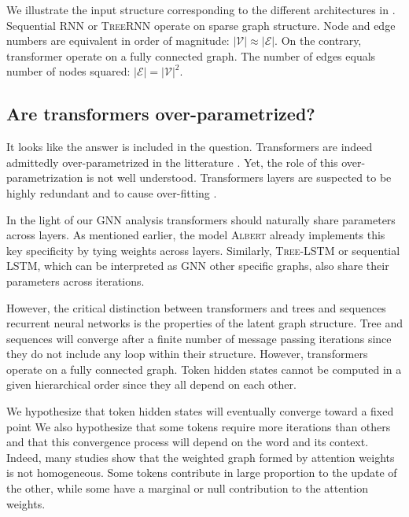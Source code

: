We illustrate the input structure corresponding to the different architectures in .
Sequential \textsc{RNN} or \textsc{TreeRNN} operate on sparse graph structure. Node and edge numbers are equivalent in order of magnitude: $|\mathcal{V}| \approx |\mathcal{E}|$. On the contrary, transformer operate on a fully connected graph. The number of edges equals number of nodes squared: $|\mathcal{E}| = |\mathcal{V}|^2$.

\subsection{Are transformers over-parametrized?}


It looks like the answer is included in the question. 
Transformers are indeed admittedly over-parametrized in the litterature \parencite{chen_20, hou_20, voita_19}. 
Yet, the role of this over-parametrization is not well understood. 
Transformers layers are suspected to be highly redundant \parencite{liu_20} and to cause over-fitting \parencite{fan_20, zhou_20b}. 

In the light of our GNN analysis transformers should naturally share parameters across layers. As mentioned earlier, the model \textsc{Albert} \parencite{lan_20} already implements this key specificity by tying weights across layers. Similarly, \textsc{Tree-LSTM} or sequential \textsc{LSTM}, which can be interpreted as GNN other specific graphs, also share their parameters across iterations.

However, the critical distinction between transformers and trees and sequences recurrent neural networks is the properties of the latent graph structure. Tree and sequences will converge after a finite number of message passing iterations since they do not include any loop within their structure. However, transformers operate on a fully connected graph. Token hidden states cannot be computed in a given hierarchical order since they all depend on each other.

We hypothesize that token hidden states will eventually converge toward a fixed point We also hypothesize that some tokens require more iterations than others and that this convergence process will depend on the word and its context. Indeed, many studies show that the weighted graph formed by attention weights is not homogeneous. Some tokens contribute in large proportion to the update of the other, while some have a marginal or null contribution to the attention weights.

